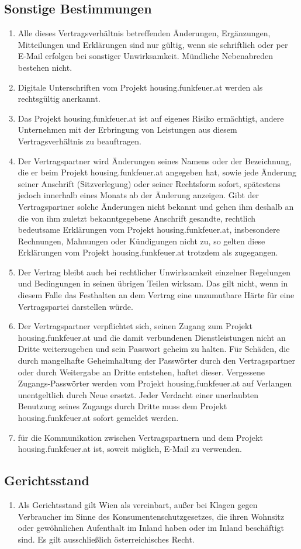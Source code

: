 \documentclass[parskip=half]{article}
\begin{document}
\subsection{ Sonstige Bestimmungen}
\begin{enumerate}
\item Alle dieses Vertragsverhältnis betreffenden Änderungen, Ergänzungen, Mitteilungen
und Erklärungen sind nur gültig, wenn sie schriftlich oder per E-Mail erfolgen bei
sonstiger Unwirksamkeit. Mündliche Nebenabreden bestehen nicht.
\item Digitale Unterschriften vom Projekt housing.funkfeuer.at werden als rechtsgültig
anerkannt.
\item Das Projekt housing.funkfeuer.at ist auf eigenes Risiko ermächtigt, andere
Unternehmen mit der Erbringung von Leistungen aus diesem Vertragsverhältnis zu
beauftragen.
\item Der Vertragspartner wird Änderungen seines Namens oder der Bezeichnung, die er
beim Projekt housing.funkfeuer.at angegeben hat, sowie jede Änderung seiner Anschrift
(Sitzverlegung) oder seiner Rechtsform sofort, spätestens jedoch innerhalb eines Monats
ab der Änderung anzeigen. Gibt der Vertragspartner solche Änderungen nicht bekannt
und gehen ihm deshalb an die von ihm zuletzt bekanntgegebene Anschrift gesandte,
rechtlich bedeutsame Erklärungen vom Projekt housing.funkfeuer.at, insbesondere
Rechnungen, Mahnungen oder Kündigungen nicht zu, so gelten diese Erklärungen vom
Projekt housing.funkfeuer.at trotzdem als zugegangen.
\item Der Vertrag bleibt auch bei rechtlicher Unwirksamkeit einzelner Regelungen und
Bedingungen in seinen übrigen Teilen wirksam. Das gilt nicht, wenn in diesem Falle das
Festhalten an dem Vertrag eine unzumutbare Härte für eine Vertragspartei darstellen
würde.
\item Der Vertragspartner verpflichtet sich, seinen Zugang zum Projekt housing.funkfeuer.at
und die damit verbundenen Dienstleistungen nicht an Dritte weiterzugeben und sein
Passwort geheim zu halten. Für Schäden, die durch mangelhafte Geheimhaltung der
Passwörter durch den Vertragspartner oder durch Weitergabe an Dritte entstehen, haftet
dieser. Vergessene Zugangs-Passwörter werden vom Projekt housing.funkfeuer.at auf
Verlangen unentgeltlich durch Neue ersetzt. Jeder Verdacht einer unerlaubten Benutzung
seines Zugangs durch Dritte muss dem Projekt housing.funkfeuer.at sofort gemeldet
werden.
\item für die Kommunikation zwischen Vertragspartnern und dem Projekt housing.funkfeuer.at ist,
soweit möglich, E-Mail zu verwenden.
\end{enumerate}

\subsection{ Gerichtsstand}
\begin{enumerate}
\item Als Gerichtsstand gilt Wien als vereinbart, außer bei Klagen gegen Verbraucher im Sinne
des Konsumentenschutzgesetzes, die ihren Wohnsitz oder gewöhnlichen Aufenthalt im
Inland haben oder im Inland beschäftigt sind. Es gilt ausschließlich österreichisches Recht.
\end{enumerate}
\end{document}
